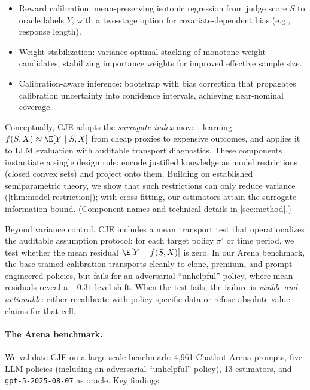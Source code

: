 \begin{itemize}[leftmargin=*,itemsep=2pt,topsep=2pt]
\item Reward calibration: mean-preserving isotonic regression from judge score $S$ to oracle labels $Y$, with a two-stage option for covariate-dependent bias (e.g., response length).
\item Weight stabilization: variance-optimal stacking of monotone weight candidates, stabilizing importance weights for improved effective sample size.
\item Calibration-aware inference: bootstrap with bias correction that propagates calibration uncertainty into confidence intervals, achieving near-nominal coverage.
\end{itemize}

\noindent Conceptually, CJE adopts the \emph{surrogate index} move \citep{AtheyChettyImbensKang2019}, learning $f(S,X) \approx \E[Y \mid S,X]$ from cheap proxies to expensive outcomes, and applies it to LLM evaluation with auditable transport diagnostics. These components instantiate a single design rule: encode justified knowledge as model restrictions (closed convex sets) and project onto them. Building on established semiparametric theory, we show that such restrictions can only reduce variance (\cref{thm:model-restriction}); with cross-fitting, our estimators attain the surrogate information bound. (Component names and technical details in \cref{sec:method}.)

Beyond variance control, CJE includes a mean transport test that operationalizes the auditable assumption protocol: for each target policy $\pi'$ or time period, we test whether the mean residual $\E[Y - f(S,X)]$ is zero. In our Arena benchmark, the base-trained calibration transports cleanly to clone, premium, and prompt-engineered policies, but fails for an adversarial ``unhelpful'' policy, where mean residuals reveal a $-0.31$ level shift. When the test fails, the failure is \emph{visible and actionable}: either recalibrate with policy-specific data or refuse absolute value claims for that cell.

\paragraph{The Arena benchmark.}
We validate CJE on a large-scale benchmark: 4,961 Chatbot Arena prompts, five LLM policies (including an adversarial ``unhelpful'' policy), 13 estimators, and \texttt{gpt-5-2025-08-07} as oracle. Key findings:

